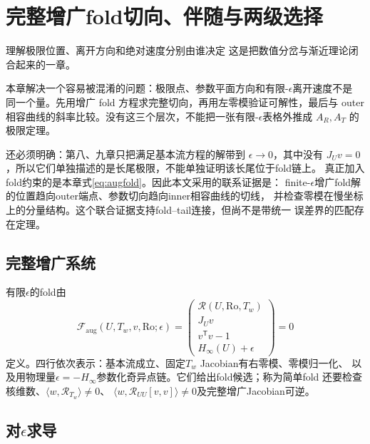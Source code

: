 \documentclass[UTF8,zihao=-4,openany]{ctexbook}
\newcommand{\eps}{\epsilon}
\newcommand{\Ro}{\mathrm{Ro}}
\newcommand{\R}{\mathcal R}
\begin{document}
\chapter{完整增广fold切向、伴随与两级选择}\label{ch:tangent}

\begin{learninggoal}{理解极限位置、离开方向和绝对速度分别由谁决定}
这是把数值分岔与渐近理论闭合起来的一章。
\end{learninggoal}

本章解决一个容易被混淆的问题：极限点、参数平面方向和有限-$\eps$离开速度不是
同一个量。先用增广 fold 方程求完整切向，再用左零模验证可解性，最后与 outer
相容曲线的斜率比较。没有这三个层次，不能把一张有限-$\eps$表格外推成
$A_R,A_T$ 的极限定理。

还必须明确：第八、九章只把满足基本流方程的解带到 $\eps\to0$，其中没有
$J_Uv=0$，所以它们单独描述的是长尾极限，不能单独证明该长尾位于fold链上。
真正加入fold约束的是本章式\eqref{eq:augfold}。因此本文采用的联系证据是：
finite-$\eps$增广fold解的位置趋向outer端点、参数切向趋向inner相容曲线的切线，
并检查零模在慢坐标上的分量结构。这个联合证据支持fold--tail连接，但尚不是带统一
误差界的匹配存在定理。

\section{完整增广系统}

有限$\eps$的fold由
\begin{equation}\label{eq:augfold}
 \mathcal F_{\mathrm{aug}}(U,T_w,v,\Ro;\eps)=
 \begin{pmatrix}
  \R(U,\Ro,T_w)\\
  J_Uv\\
  v^\mathsf{T}v-1\\
  H_\infty(U)+\eps
 \end{pmatrix}=0
\end{equation}
定义。四行依次表示：基本流成立、固定$T_w$ Jacobian有右零模、零模归一化、
以及用物理量$\eps=-H_\infty$参数化奇异点链。它们给出fold候选；称为简单fold
还要检查核维数、$\langle w,\R_{T_w}\rangle\ne0$、
$\langle w,\R_{UU}[v,v]\rangle\ne0$及完整增广Jacobian可逆。

\section{对$\eps$求导}
\end{document}
